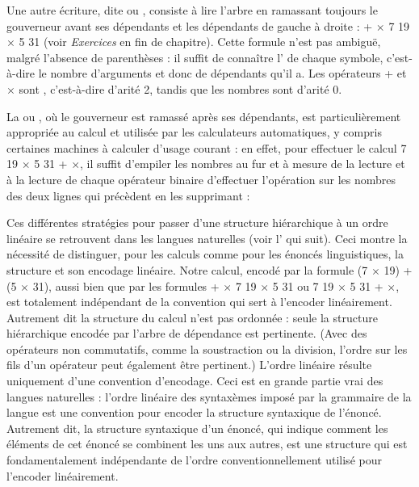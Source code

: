 {    Une autre écriture, dite  ou , consiste à lire l’arbre en ramassant toujours le gouverneur avant ses dépendants et les dépendants de gauche à droite : + \textrm{${\times}$} 7 19 \textrm{${\times}$} 5 31 (voir \textit{Exercices} en fin de chapitre). Cette formule n’est pas ambiguë, malgré l’absence de parenthèses : il suffit de connaître l’ de chaque symbole, c’est-à-dire le nombre d’arguments et donc de dépendants qu’il a. Les opérateurs + et \textrm{${\times}$} sont , c’est-à-dire d’arité 2, tandis que les nombres sont d’arité 0.

    La \textstyleTermes{}  ou , où le gouverneur est ramassé après ses dépendants, est particulièrement appropriée au calcul et utilisée par les calculateurs automatiques, y compris certaines machines à calculer d’usage courant : en effet, pour effectuer le calcul 7 19 \textrm{${\times}$} 5 31 + \textrm{${\times}$}, il suffit d’empiler les nombres au fur et à mesure de la lecture et à la lecture de chaque opérateur binaire d’effectuer l’opération sur les nombres des deux lignes qui précèdent en les supprimant :

    \ea
    \z

    Ces différentes stratégies pour passer d’une structure hiérarchique à un ordre linéaire se retrouvent dans les langues naturelles (voir l’ qui suit). Ceci montre la nécessité de distinguer, pour les calculs comme pour les énoncés linguistiques, la structure et son encodage linéaire. Notre calcul, encodé par la formule (7 \textrm{${\times}$} 19) + (5 \textrm{${\times}$} 31), aussi bien que par les formules + \textrm{${\times}$} 7 19 \textrm{${\times}$} 5 31 ou 7 19 \textrm{${\times}$} 5 31 + \textrm{${\times}$}, est totalement indépendant de la convention qui sert à l’encoder linéairement. Autrement dit la structure du calcul n’est pas ordonnée : seule la structure hiérarchique encodée par l’arbre de dépendance est pertinente. (Avec des opérateurs non commutatifs, comme la soustraction ou la division, l’ordre sur les fils d’un opérateur peut également être pertinent.) L’ordre linéaire résulte uniquement d’une convention d’encodage. Ceci est en grande partie vrai des langues naturelles : l’ordre linéaire des syntaxèmes imposé par la grammaire de la langue est une convention pour encoder la structure syntaxique de l’énoncé. Autrement dit, la structure syntaxique d’un énoncé, qui indique comment les éléments de cet énoncé se combinent les uns aux autres, est une structure qui est fondamentalement indépendante de l’ordre conventionnellement utilisé pour l’encoder linéairement.
}

